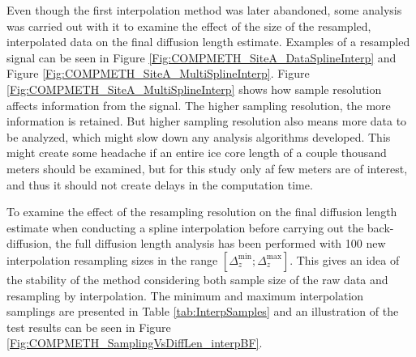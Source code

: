 \documentclass[../../CompleteThesis2/Complete_2ndDraft]{subfiles}
\begin{document}
Even though the first interpolation method was later abandoned, some analysis was carried out with it to examine the effect of the size of the resampled, interpolated data on the final diffusion length estimate. Examples of a resampled signal can be seen in Figure \ref{Fig:COMPMETH_SiteA_DataSplineInterp} and Figure \ref{Fig:COMPMETH_SiteA_MultiSplineInterp}. Figure \ref{Fig:COMPMETH_SiteA_MultiSplineInterp} shows how sample resolution affects information from the signal. The higher sampling resolution, the more information is retained. But higher sampling resolution also means more data to be analyzed, which might slow down any analysis algorithms developed. This might create some headache if an entire ice core length of a couple thousand meters should be examined, but for this study only af few meters are of interest, and thus it should not create delays in the computation time.

To examine the effect of the resampling resolution on the final diffusion length estimate when conducting a spline interpolation before carrying out the back-diffusion, the full diffusion length analysis has been performed with 100 new interpolation resampling sizes in the range $[\Delta_z^{\text{min}};\Delta_z^{\text{max}}]$. This gives an idea of the stability of the method considering both sample size of the raw data and resampling by interpolation. The minimum and maximum interpolation samplings are presented in Table \ref{tab:InterpSamples} and an illustration of the test results can be seen in Figure \ref{Fig:COMPMETH_SamplingVsDiffLen_interpBF}. 
\end{document}
